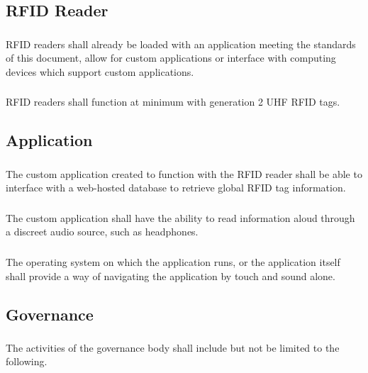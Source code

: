 \documentclass{article}
\begin{document}
\subsection{RFID Reader}

\subsubsection{} RFID readers shall already be loaded with an application meeting the standards of this document, allow for custom applications or interface with computing devices which support custom applications.

\subsubsection{} RFID readers shall function at minimum with generation 2 UHF RFID tags.

\subsection{Application}

\subsubsection{} The custom application created to function with the RFID reader shall be able to interface with a web-hosted database to retrieve global RFID tag information.

\subsubsection{} The custom application shall have the ability to read information aloud through a discreet audio source, such as headphones.

\subsubsection{} The operating system on which the application runs, or the application itself shall provide a way of navigating the application by touch and sound alone.

\subsection{Governance}

\subsubsection{} The activities of the governance body shall include but not be limited to the following.
\end{document}
